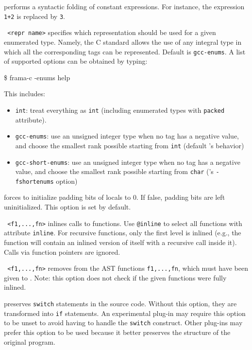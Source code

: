 \begin{description}
\item {} performs a syntactic folding of
constant expressions. For instance,
the expression \texttt{1+2} is replaced by \texttt{3}.

\item \texttt{ <repr name>} specifies which representation
should be used for a given enumerated type. Namely, the C standard allows the use
of any integral type in which all the corresponding tags can be represented.
Default is \texttt{gcc-enums}. A list of supported
options can be obtained by typing:
\begin{frama-c-commands}
\$ frama-c -enums help
\end{frama-c-commands}
This includes:
\begin{itemize}
\item \texttt{int}: treat everything as \texttt{int} (including enumerated types
with \texttt{packed} attribute).
\item \texttt{gcc-enums}: use an unsigned integer type when no tag has a
negative value, and choose the smallest rank possible starting from \texttt{int}
(default \gcc's behavior)
\item \texttt{gcc-short-enums}: use an unsigned integer type when no tag has
a negative value, and choose the smallest rank possible starting from
\texttt{char} (\gcc's \texttt{-fshortenums} option)
\end{itemize}

\item {} forces to initialize padding
  bits of locals to 0. If false, padding bits are left uninitialized. This
  option is set by default.

\item \texttt{ <f1,...,fn>} inlines calls to
  functions. Use \texttt{@inline} to select all functions with attribute
  \texttt{inline}.
  For recursive functions, only the first level
  is inlined (e.g., the function will contain an inlined version of itself with
  a recursive call inside it). Calls via function pointers are ignored.

\item \texttt{ <f1,...,fn>} removes from the AST
  functions \texttt{f1,...,fn}, which must have been given to
  . Note: this option does not check if the given
  functions were fully inlined.

\item {} preserves \texttt{switch} statements in the
  source code. Without this option, they are transformed into \texttt{if}
  statements. An experimental plug-in may require this option to be unset
  to avoid having to handle the \texttt{switch} construct.
  Other plug-ins may prefer this option to be used because it better
  preserves the structure of the original program.


\end{description}
